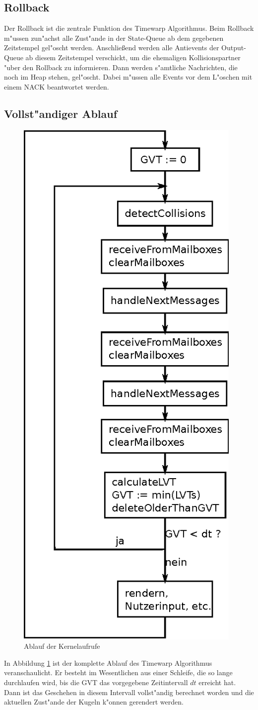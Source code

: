 \documentclass[a4paper, 10pt, openright, parskip, chapterprefix]{scrreprt}
\begin{document}
\subsection{Rollback}
\label{subsec:Rollback}
Der Rollback ist die zentrale Funktion des Timewarp Algorithmus. Beim Rollback m"ussen zun"achst alle Zust"ande in der
State-Queue ab dem gegebenen Zeitstempel gel"oscht werden. Anschlie\ss end werden alle Antievents der Output-Queue ab
diesem Zeitstempel verschickt, um die ehemaligen Kollisionspartner "uber den Rollback zu informieren. 
Dann werden s"amtliche Nachrichten, die noch im Heap stehen, gel"oscht. Dabei m"ussen
alle Events vor dem L"oschen mit einem NACK beantwortet werden.

\subsection{Vollst"andiger Ablauf}
\begin{figure}
	\centering
	\includegraphics[width=.45\textwidth]{Ablauf.eps}
	\caption{Ablauf der Kernelaufrufe}
	\label{fig:Ablauf}
\end{figure}
In Abbildung \ref{fig:Ablauf} ist der komplette Ablauf des Timewarp Algorithmus veranschaulicht.
Er besteht im Wesentlichen aus einer Schleife, die so lange durchlaufen wird, bis die GVT das vorgegebene Zeitintervall
$dt$ erreicht hat. Dann ist das Geschehen in diesem Intervall vollst"andig berechnet worden und die aktuellen Zust"ande der
Kugeln k"onnen gerendert werden.
\end{document}
